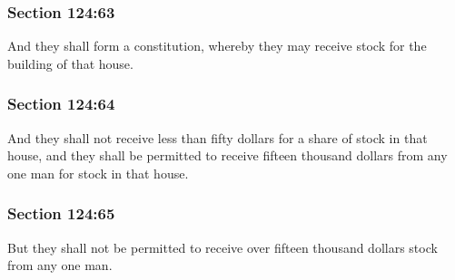 	\subsubsection{Section 124:63} %
		\label{DC124-63}

		And they shall form a constitution, whereby they may receive stock for the building of that house.


	\subsubsection{Section 124:64} %
		\label{DC124-64}

		And they shall not receive less than fifty dollars for a share of stock in that house, and they shall be permitted to receive fifteen thousand dollars from any one man for stock in that house.


	\subsubsection{Section 124:65} %
		\label{DC124-65}

		But they shall not be permitted to receive over fifteen thousand dollars stock from any one man.


